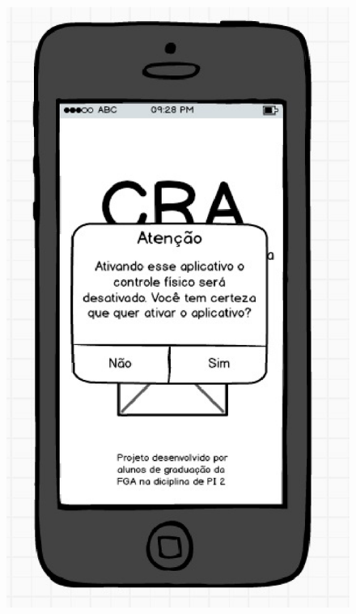 \begin{figure}[!htb]
{  		\includegraphics[keepaspectratio=true,scale=0.6]{figuras/controle/tela_2}
		}
  \end{figure}

